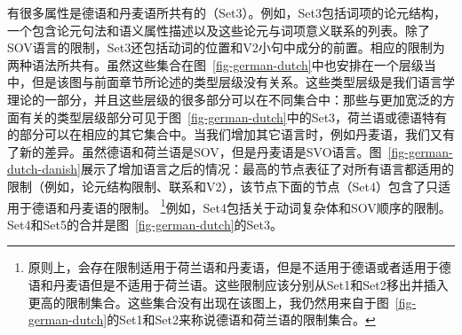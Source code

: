 有很多属性是德语和丹麦语所共有的（Set3）。例如，Set3包括词项的论元结构，一个包含论元句法和语义属性描述以及这些论元与词项意义联系的列表。除了SOV语言的限制，Set3还包括动词的位置和V2小句中成分的前置。相应的限制为两种语法所共有。虽然这些集合在图~\ref{fig-german-dutch}中也安排在一个层级当中，但是该图与前面章节所论述的类型层级没有关系。这些类型层级是我们语言学理论的一部分，并且这些层级的很多部分可以在不同集合中：那些与更加宽泛的方面有关的类型层级部分可见于图~\ref{fig-german-dutch}中的Set3，荷兰语或德语特有的部分可以在相应的其它集合中。当我们增加其它语言时，例如丹麦语，我们又有了新的差异。虽然德语和荷兰语是SOV，但是丹麦语是SVO语言。图~\vref{fig-german-dutch-danish}展示了增加语言之后的情况：最高的节点表征了对所有语言都适用的限制（例如，论元结构限制、联系和V2），该节点下面的节点（Set4）包含了只适用于德语和丹麦语的限制。 \footnote{%
原则上，会存在限制适用于荷兰语和丹麦语，但是不适用于德语或者适用于德语和丹麦语但是不适用于荷兰语。这些限制应该分别从Set1和Set2移出并插入更高的限制集合。这些集合没有出现在该图上，我仍然用来自于图~\ref{fig-german-dutch}的Set1和Set2来称说德语和荷兰语的限制集合。  
}例如，Set4包括关于动词复杂体和SOV顺序的限制。Set4和Set5的合并是图~\ref{fig-german-dutch}的Set3。
